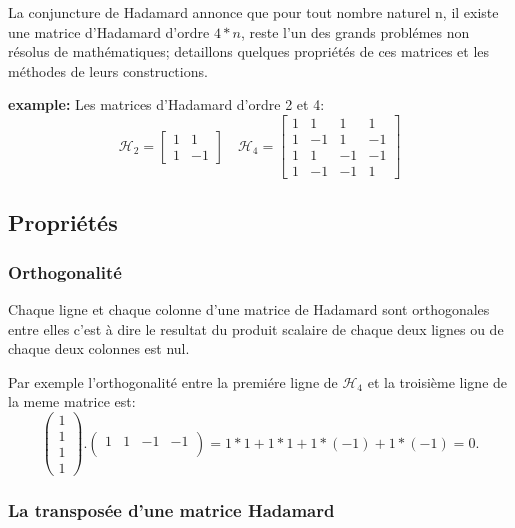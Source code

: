 \documentclass{article}
\begin{document}
La conjuncture de Hadamard annonce que pour tout nombre naturel n, il 
existe une matrice d'Hadamard d'ordre $4*n$, reste l'un des grands 
problémes non résolus de mathématiques; detaillons quelques propriétés de 
ces matrices et les méthodes de leurs constructions.

\textbf{example:} Les matrices d'Hadamard d'ordre 2 et 4:\\

\begin{equation*}
\mathcal{H}_2 = \begin{bmatrix}
	1 & 1\\
	1 & -1
\end{bmatrix}
\quad
\mathcal{H}_4 = \begin{bmatrix}
	1 & 1 & 1 & 1\\
	1 & -1 & 1 & -1\\
	1 & 1 & -1 & -1\\
	1 & -1 & -1 & 1
\end{bmatrix}
\end{equation*}

\subsection{Propriétés}

\subsubsection{Orthogonalité}

Chaque ligne et chaque colonne d'une matrice de Hadamard sont orthogonales
entre elles c'est à dire le resultat du produit scalaire de chaque deux 
lignes ou de chaque deux colonnes est nul.

Par exemple l'orthogonalité entre la premiére ligne de $\mathcal{H}_4$ et 
la troisième ligne de la meme matrice est:
\begin{equation*}
	\begin{pmatrix}
		1\\
		1\\
		1\\ 
		1
	\end {pmatrix}
	.
	\begin{pmatrix}
		1 & 1 & -1 & -1\\ 
	\end{pmatrix}
	= 1*1+1*1+1*(-1)+1*(-1) = 0. 
\end{equation*}

\subsubsection{La transposée d'une matrice Hadamard}
\end{document}
